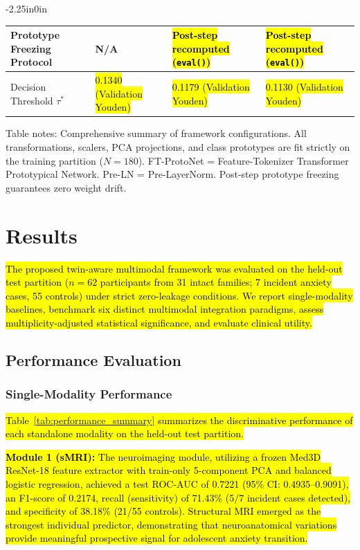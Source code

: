 \documentclass[10pt,letterpaper]{article}
\begin{document}
\begin{table}[!t]
\begin{adjustwidth}{-2.25in}{0in}
\begin{tabular}{|p{3.8cm}|p{3.5cm}|p{3.5cm}|p{3.5cm}|}
\hline
Prototype Freezing Protocol & N/A & \hl{Post-step recomputed (\texttt{eval()})} & \hl{Post-step recomputed (\texttt{eval()})} \\
\hline
Decision Threshold $\tau^*$ & \hl{0.1340 (Validation Youden)} & \hl{0.1179 (Validation Youden)} & \hl{0.1130 (Validation Youden)} \\
\hline
\end{tabular}
\begin{flushleft}
Table notes: Comprehensive summary of framework configurations. All transformations, scalers, PCA projections, and class prototypes are fit strictly on the training partition ($N=180$). FT-ProtoNet = Feature-Tokenizer Transformer Prototypical Network. Pre-LN = Pre-LayerNorm. Post-step prototype freezing guarantees zero weight drift.
\end{flushleft}
\end{adjustwidth}
\end{table}

\section*{Results}

\hl{The proposed twin-aware multimodal framework was evaluated on the held-out test partition ($n=62$ participants from 31 intact families; 7 incident anxiety cases, 55 controls) under strict zero-leakage conditions. We report single-modality baselines, benchmark six distinct multimodal integration paradigms, assess multiplicity-adjusted statistical significance, and evaluate clinical utility.}

\subsection*{Performance Evaluation}
\subsubsection*{Single-Modality Performance}
\hl{Table~\ref{tab:performance_summary} summarizes the discriminative performance of each standalone modality on the held-out test partition.}

\hl{\textbf{Module 1 (sMRI):} The neuroimaging module, utilizing a frozen Med3D ResNet-18 feature extractor with train-only 5-component PCA and balanced logistic regression, achieved a test ROC-AUC of 0.7221 (95\% CI: 0.4935--0.9091), an F1-score of 0.2174, recall (sensitivity) of 71.43\% (5/7 incident cases detected), and specificity of 38.18\% (21/55 controls). Structural MRI emerged as the strongest individual predictor, demonstrating that neuroanatomical variations provide meaningful prospective signal for adolescent anxiety transition.}
\end{document}
